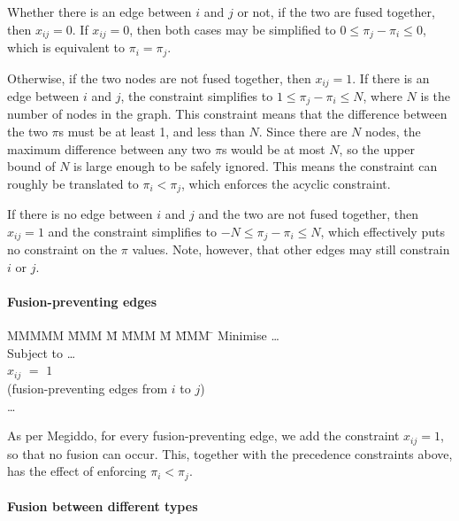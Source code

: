 Whether there is an edge between $i$ and $j$ or not, if the two are fused together, then $x_{ij} = 0$. If $x_{ij} = 0$, then both cases may be simplified to $0 \le \pi_j - \pi_i \le 0$, which is equivalent to $\pi_i = \pi_j$. 

Otherwise, if the two nodes are not fused together, then $x_{ij} = 1$. If there is an edge between $i$ and $j$, the constraint simplifies to $1 \le \pi_j - \pi_i \le N$, where $N$ is the number of nodes in the graph. This constraint means that the difference between the two $\pi$s must be at least 1, and less than $N$. Since there are $N$ nodes, the maximum difference between any two $\pi$s would be at most $N$, so the upper bound of $N$ is large enough to be safely ignored. This means the constraint can roughly be translated to $\pi_i < \pi_j$, which enforces the acyclic constraint.

If there is no edge between $i$ and $j$ and the two are not fused together, then $x_{ij} = 1$ and the constraint simplifies to $-N \le \pi_j - \pi_i \le N$, which effectively puts no constraint on the $\pi$ values.
Note, however, that other edges may still constrain $i$ or $j$.


\paragraph{Fusion-preventing edges}
\begin{tabbing}
MMMMM   \= MMM \= M \= MMM \= M \= MMM \= \kill
Minimise   \> \ldots \\
Subject to \> \ldots \\
           \> $x_{ij}$    \> $=$   \> $1$             \>       \>            \\
           \> (fusion-preventing edges from $i$ to $j$)      \\
           \> \ldots
\end{tabbing}
As per Megiddo\cite{megiddo1998optimal}, for every fusion-preventing edge, we add the constraint $x_{ij} = 1$, so that no fusion can occur. This, together with the precedence constraints above, has the effect of enforcing $\pi_i < \pi_j$.


\paragraph{Fusion between different types}

